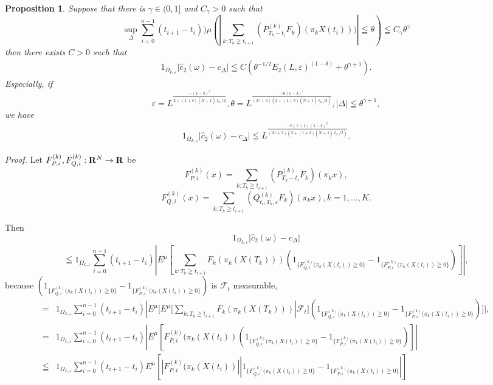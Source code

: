 \documentclass[12pt]{article}
\newtheorem{prop}[thm]{Proposition}%
\begin{document}
\begin{prop}
Suppose that there is $ \gamma \in (0,1]$  and $C_{\gamma} >0$ such that
  $$\sup_{\Delta} \sum_{i=0}^{n-1} (t_{i+1}-t_i)){\mu} (| \sum_{k:T_k\geqq t_{i+1}} (P_{T_k-t_i}^{(k)}F_k)(\pi_k X(t_i)))| \leqq \theta ) \leqq C_{\gamma}\theta^{\gamma}$$
then there exists $C>0$ such that
\begin{align*}
1_{\Omega_{L, \varepsilon} }|\hat{c}_2(\omega)-c_{\Delta}|
\leqq C \left( \theta^{-1/2} E_2(L,  \varepsilon)^{(1-\delta)}+\theta^{\gamma+1}\right).
\end{align*}
Especially, if 
$$\varepsilon = L^{\frac{-(1-\delta)^2}{{2+(1+\delta)(\tilde{N}+1)\ell_0/2}} }, \theta =  L^{\frac{-6(1-\delta)^2}{ (2\gamma+3) (2+(1+\delta)(\tilde{N}+1)\ell_0/2) } }, |\Delta| \leqq \theta^{\gamma+1}, $$
we have
\begin{align*}
1_{\Omega_{L, \varepsilon} }|\hat{c}_2(\omega)-c_{\Delta}|
\leqq L^{\frac{-6(\gamma+1)(1-\delta)^2}{ (2\gamma+3) (2+(1+\delta)(\tilde{N}+1)\ell_0/2) } }.
\end{align*}
\end{prop}
{\it Proof.}
Let $F^{(k)}_{P,i }, F^{(k)}_{Q,i }: {\bf R}^N \to {\bf R}$ be
$$F^{(k)}_{P,i }(x) = \sum_{k:T_k\geqq t_{i+1}} (P_{T_k-t_i}^{(k)} F_k) (\pi_k x),$$
$$F^{(k)}_{Q,i }(x)=\sum_{k:T_k\geqq t_{i+1} } (Q_{t_i,T_k, \varepsilon}^{(k)}F_k)(\pi_k x), k=1,\ldots,K.$$
 
Then
$$1_{\Omega_{L, \varepsilon} }|\hat{c}_2(\omega)-c_{\Delta}|$$
 $$
  \leqq 1_{\Omega_{L, \varepsilon} } \sum_{i=0}^{n-1}(t_{i+1}-t_i)
|E ^{\mu}[\sum_{k:T_k\geqq t_{i+1}}F_k (\pi_k (X(T_k)))
(1_{\{F^{(k)}_{Q,i}(\pi_k (X(t_i)) \geqq 0\}} -1_{\{F^{(k)}_{P,i}(\pi_k (X(t_i)) \geqq 0\}})]|,$$
 because $(1_{\{F^{(k)}_{Q,i}(\pi_k (X(t_i)) \geqq 0\}} -1_{\{F^{(k)}_{P,i}(\pi_k (X(t_i)) \geqq 0\}})$ is $\mathcal{F}_t$ measurable,
  \begin{align*} 
= &1_{\Omega_{L, \varepsilon} } \sum_{i=0}^{n-1}(t_{i+1}-t_i)
|E^{\mu}[ E ^{\mu}[\sum_{k:T_k\geqq t_{i+1}}F_k (\pi_k (X(T_k))) | \mathcal{F}_t]
(1_{\{F^{(k)}_{Q,i}(\pi_k (X(t_i)) \geqq 0\}} -1_{\{F^{(k)}_{P,i}(\pi_k (X(t_i)) \geqq 0\}})]|,\\
= &1_{\Omega_{L, \varepsilon} } \sum_{i=0}^{n-1}(t_{i+1}-t_i)
|E ^{\mu}[F^{(k)}_{P,i}(\pi_k (X(t_i))
(1_{\{F^{(k)}_{Q,i}(\pi_k (X(t_i)) \geqq 0\}} -1_{\{F^{(k)}_{P,i}(\pi_k (X(t_i)) \geqq 0\}})]|\\
   \leqq &1_{\Omega_{L, \varepsilon} } \sum_{i=0}^{n-1}(t_{i+1}-t_i)
E ^{\mu}[|F^{(k)}_{P,i}(\pi_k (X(t_i))| 
|1_{\{F^{(k)}_{Q,i}(\pi_k (X(t_i)) \geqq 0\}} -1_{\{F^{(k)}_{P,i}(\pi_k (X(t_i)) \geqq 0\}}|]
 \end{align*}
 
\end{document}
